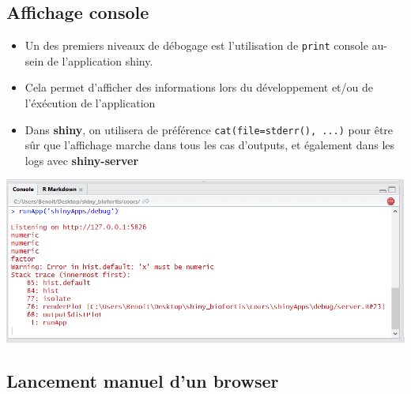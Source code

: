 \documentclass[
]{article}
\newenvironment{Shaded}{\begin{snugshade}}{\end{snugshade}}
\newcommand{\AttributeTok}[1]{\textcolor[rgb]{0.13,0.29,0.53}{#1}}
\newcommand{\CommentTok}[1]{\textcolor[rgb]{0.56,0.35,0.01}{\textit{#1}}}
\newcommand{\FunctionTok}[1]{\textcolor[rgb]{0.13,0.29,0.53}{\textbf{#1}}}
\newcommand{\NormalTok}[1]{#1}
\newcommand{\OtherTok}[1]{\textcolor[rgb]{0.56,0.35,0.01}{#1}}
\newcommand{\SpecialCharTok}[1]{\textcolor[rgb]{0.81,0.36,0.00}{\textbf{#1}}}
\providecommand{\tightlist}{%
  \setlength{\itemsep}{0pt}\setlength{\parskip}{0pt}}
\begin{document}
\hypertarget{affichage-console}{%
\subsection{Affichage console}\label{affichage-console}}

\begin{itemize}
\tightlist
\item
  Un des premiers niveaux de débogage est l'utilisation de
  \texttt{print} console au-sein de l'application shiny.
\item
  Cela permet d'afficher des informations lors du développement et/ou de
  l'éxécution de l'application
\item
  Dans \textbf{shiny}, on utilisera de préférence
  \texttt{cat(file=stderr(),\ ...)} pour être sûr que l'affichage marche
  dans tous les cas d'outputs, et également dans les logs avec
  \textbf{shiny-server}
\end{itemize}

\begin{Shaded}
\end{Shaded}

\includegraphics{img/debug_cat.png}

\hypertarget{lancement-manuel-dun-browser}{%
\subsection{Lancement manuel d'un
browser}\label{lancement-manuel-dun-browser}}
\end{document}
